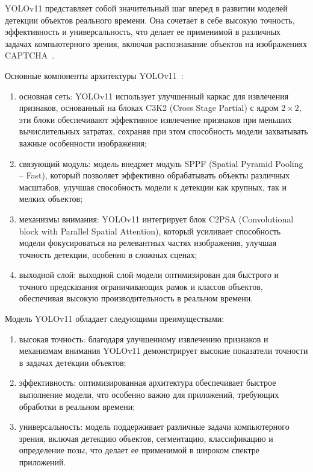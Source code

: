 YOLOv11 представляет собой значительный шаг вперед в развитии моделей детекции 
объектов реального времени. Она сочетает в себе высокую точность, эффективность и 
универсальность, что делает ее применимой в различных задачах компьютерного 
зрения, включая распознавание объектов на изображениях CAPTCHA~\cite{yolo}.

Основные компоненты архитектуры YOLOv11~\cite{yolov11}:

\begin{enumerate}
    \item основная сеть: YOLOv11 использует улучшенный каркас для извлечения 
    признаков, основанный на блоках C3K2 (Cross Stage Partial) с ядром 
    $2\times2$, эти блоки обеспечивают эффективное извлечение признаков при 
    меньших вычислительных затратах, сохраняя при этом способность модели 
    захватывать важные особенности изображения;
    \item связующий модуль: модель внедряет модуль SPPF (Spatial Pyramid 
    Pooling -- Fast), который позволяет эффективно обрабатывать объекты различных 
    масштабов, улучшая способность модели к детекции как крупных, так и мелких 
    объектов;
    \item механизмы внимания: YOLOv11 интегрирует блок C2PSA (Convolutional block 
    with Parallel Spatial Attention), который усиливает способность модели 
    фокусироваться на релевантных частях изображения, улучшая точность детекции, 
    особенно в сложных сценах;
    \item выходной слой: выходной слой модели оптимизирован для быстрого и точного 
    предсказания ограничивающих рамок и классов объектов, обеспечивая 
    высокую производительность в реальном времени.
\end{enumerate}

Модель YOLOv11 обладает следующими преимуществами:

\begin{enumerate}
    \item высокая точность: благодаря улучшенному извлечению признаков и 
    механизмам внимания YOLOv11 демонстрирует высокие показатели точности в 
    задачах детекции объектов;
    \item эффективность: оптимизированная архитектура обеспечивает быстрое 
    выполнение модели, что особенно важно для приложений, требующих обработки в 
    реальном времени;
    \item универсальность: модель поддерживает различные задачи компьютерного 
    зрения, включая детекцию объектов, сегментацию, классификацию и определение 
    позы, что делает ее применимой в широком спектре приложений.
\end{enumerate}

